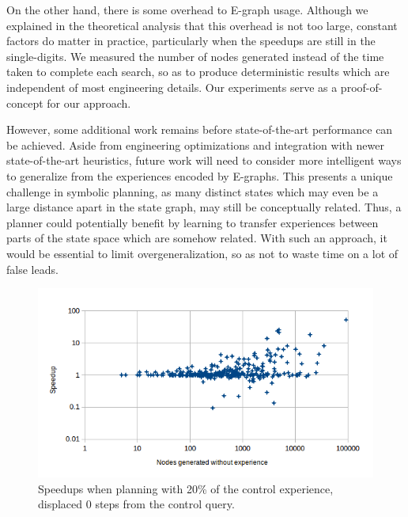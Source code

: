 \documentclass[letterpaper]{article}
\begin{document}
On the other hand, there is some overhead to E-graph usage.
Although we explained in the theoretical analysis that this overhead is not too large, constant factors do matter in practice, particularly when the speedups are still in the single-digits.
We measured the number of nodes generated instead of the time taken to complete each search, so as to produce deterministic results which are independent of most engineering details.
Our experiments serve as a proof-of-concept for our approach.

However, some additional work remains before state-of-the-art performance can be achieved.
Aside from engineering optimizations and integration with newer state-of-the-art heuristics, future work will need to consider more intelligent ways to generalize from the experiences encoded by E-graphs.
This presents a unique challenge in symbolic planning, as many distinct states which may even be a large distance apart in the state graph, may still be conceptually related.
Thus, a planner could potentially benefit by learning to transfer experiences between parts of the state space which are somehow related.
With such an approach, it would be essential to limit overgeneralization, so as not to waste time on a lot of false leads.

\begin{figure}
	\centering
	\includegraphics[scale=0.5]{Speedup_20_0.png}
	\caption{Speedups when planning with 20\% of the control experience, displaced 0 steps from the control query.}
	 \label{fig:s_20_0}
\end{figure}
\end{document}
